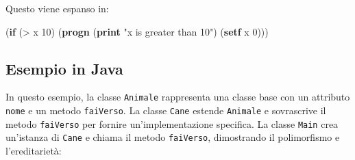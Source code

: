 \documentclass[
  letterpaper,
]{scrbook}
\newenvironment{Shaded}{\begin{snugshade}}{\end{snugshade}}
\newcommand{\DecValTok}[1]{\textcolor[rgb]{0.68,0.00,0.00}{#1}}
\newcommand{\KeywordTok}[1]{\textcolor[rgb]{0.00,0.23,0.31}{\textbf{#1}}}
\newcommand{\NormalTok}[1]{\textcolor[rgb]{0.00,0.23,0.31}{#1}}
\newcommand{\OperatorTok}[1]{\textcolor[rgb]{0.37,0.37,0.37}{#1}}
\newcommand{\StringTok}[1]{\textcolor[rgb]{0.13,0.47,0.30}{#1}}
\begin{document}
Questo viene espanso in:

\begin{Shaded}
\begin{Highlighting}[]
\NormalTok{(}\KeywordTok{if}\NormalTok{ (}\OperatorTok{\textgreater{}}\NormalTok{ x }\DecValTok{10}\NormalTok{)}
\NormalTok{    (}\KeywordTok{progn}
\NormalTok{      (}\KeywordTok{print} \StringTok{"x is greater than 10"}\NormalTok{)}
\NormalTok{      (}\KeywordTok{setf}\NormalTok{ x }\DecValTok{0}\NormalTok{)))}
\end{Highlighting}
\end{Shaded}

\subsection{Esempio in Java}\label{esempio-in-java}

In questo esempio, la classe \texttt{Animale} rappresenta una classe
base con un attributo \texttt{nome} e un metodo \texttt{faiVerso}. La
classe \texttt{Cane} estende \texttt{Animale} e sovrascrive il metodo
\texttt{faiVerso} per fornire un'implementazione specifica. La classe
\texttt{Main} crea un'istanza di \texttt{Cane} e chiama il metodo
\texttt{faiVerso}, dimostrando il polimorfismo e l'ereditarietà:
\end{document}
